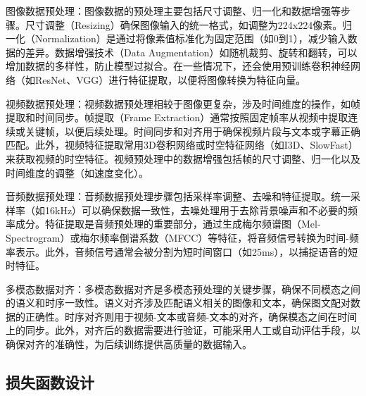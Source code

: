 \documentclass[12pt]{article}
\begin{document}
图像数据预处理：图像数据的预处理主要包括尺寸调整、归一化和数据增强等步骤。尺寸调整（Resizing）确保图像输入的统一格式，如调整为224x224像素。归一化（Normalization）是通过将像素值标准化为固定范围（如0到1），减少输入数据的差异。数据增强技术（Data Augmentation）如随机裁剪、旋转和翻转，可以增加数据的多样性，防止模型过拟合。在一些情况下，还会使用预训练卷积神经网络（如ResNet、VGG）进行特征提取，以便将图像转换为特征向量。

视频数据预处理：视频数据预处理相较于图像更复杂，涉及时间维度的操作，如帧提取和时间同步。帧提取（Frame Extraction）通常按照固定帧率从视频中提取连续或关键帧，以便后续处理。时间同步和对齐用于确保视频片段与文本或字幕正确匹配。此外，视频特征提取常用3D卷积网络或时空特征网络（如I3D、SlowFast）来获取视频的时空特征。视频预处理中的数据增强包括帧的尺寸调整、归一化以及时间维度的调整（如速度变化）。

音频数据预处理：音频数据预处理步骤包括采样率调整、去噪和特征提取。统一采样率（如16kHz）可以确保数据一致性，去噪处理用于去除背景噪声和不必要的频率成分。特征提取是音频预处理的重要部分，通过生成梅尔频谱图（Mel-Spectrogram）或梅尔频率倒谱系数（MFCC）等特征，将音频信号转换为时间-频率表示。此外，音频信号通常会被分割为短时间窗口（如25ms），以捕捉语音的短时特征。

多模态数据对齐：多模态数据对齐是多模态预处理的关键步骤，确保不同模态之间的语义和时序一致性。语义对齐涉及匹配语义相关的图像和文本，确保图文配对数据的正确性。时序对齐则用于视频-文本或音频-文本的对齐，确保模态之间在时间上的同步。此外，对齐后的数据需要进行验证，可能采用人工或自动评估手段，以确保对齐的准确性，为后续训练提供高质量的数据输入。

\subsection{损失函数设计}
\end{document}
